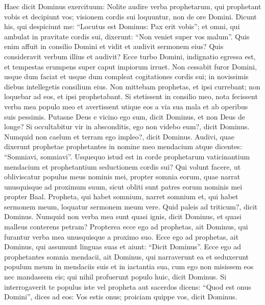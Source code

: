 \begin{biblechapter}
\begin{biblechapter}
\begin{biblechapter}
\begin{biblechapter}
\begin{biblechapter}
\begin{biblechapter}
\begin{biblechapter}
\begin{biblechapter}
\begin{biblechapter}
\begin{biblechapter}
\begin{biblechapter}
\begin{biblechapter}
\begin{biblechapter}
\begin{biblechapter}
\begin{biblechapter}
\begin{biblechapter}
\begin{biblechapter}
\begin{biblechapter}
\begin{biblechapter}
\begin{biblechapter}
\begin{biblechapter}
\begin{biblechapter}
\begin{biblechapter}
 \verse Haec dicit Dominus exercituum: Nolite audire verba prophetarum, qui prophetant vobis et decipiunt vos; visionem cordis sui loquuntur, non de ore Domini.
 \verse Dicunt his, qui despiciunt me:
 “Locutus est Dominus: Pax erit vobis”;
 et omni, qui ambulat in pravitate cordis sui,
 dixerunt: “Non veniet super vos malum”.
 \verse Quis enim affuit in consilio Domini et vidit et audivit sermonem eius? Quis consideravit verbum illius et audivit?
 \verse Ecce turbo Domini, indignatio egressa est,
 et tempestas erumpens super caput impiorum irruet.
 \verse Non cessabit furor Domini, usque dum faciat
 et usque dum compleat cogitationes cordis sui;
 in novissimis diebus intellegetis consilium eius.
 \verse Non mittebam prophetas,
 et ipsi currebant;
 non loquebar ad eos,
 et ipsi prophetabant.
 \verse Si stetissent in consilio meo,
 nota fecissent verba mea populo meo
 et avertissent utique eos a via sua mala
 et ab operibus suis pessimis.
 \verse Putasne Deus e vicino ego sum,
 dicit Dominus,
 et non Deus de longe?
 \verse Si occultabitur vir in absconditis,
 ego non videbo eum?,
 dicit Dominus.
 Numquid non caelum et terram ego impleo?,
 dicit Dominus.
 \verse Audivi, quae dixerunt prophetae prophetantes in nomine meo mendacium atque dicentes: “Somniavi, somniavi”. 
\verse Usquequo istud est in corde prophetarum vaticinantium mendacium et prophetantium seductionem cordis sui? 
\verse Qui volunt facere, ut obliviscatur populus meus nominis mei, propter somnia eorum, quae narrat unusquisque ad proximum suum, sicut obliti sunt patres eorum nominis mei propter Baal. 
\verse Propheta, qui habet somnium, narret somnium et, qui habet sermonem meum, loquatur sermonem meum vere.
 Quid paleis ad triticum?,
 dicit Dominus.
 \verse Numquid non verba mea sunt quasi ignis,
 dicit Dominus,
 et quasi malleus conterens petram? 
\verse Propterea ecce ego ad prophetas, ait Dominus, qui furantur verba mea unusquisque a proximo suo. 
\verse Ecce ego ad prophetas, ait Dominus, qui assumunt linguas suas et aiunt: “Dicit Dominus”. 
\verse Ecce ego ad prophetantes somnia mendacii, ait Dominus, qui narraverunt ea et seduxerunt populum meum in mendaciis suis et in iactantia sua, cum ego non misissem eos nec mandassem eis; qui nihil profuerunt populo huic, dicit Dominus.
 \verse Si interrogaverit te populus iste vel propheta aut sacerdos dicens: “Quod est onus Domini”, dices ad eos: Vos estis onus; proiciam quippe vos, dicit Dominus. 

\end{biblechapter}
\end{biblechapter}
\end{biblechapter}
\end{biblechapter}
\end{biblechapter}
\end{biblechapter}
\end{biblechapter}
\end{biblechapter}
\end{biblechapter}
\end{biblechapter}
\end{biblechapter}
\end{biblechapter}
\end{biblechapter}
\end{biblechapter}
\end{biblechapter}
\end{biblechapter}
\end{biblechapter}
\end{biblechapter}
\end{biblechapter}
\end{biblechapter}
\end{biblechapter}
\end{biblechapter}
\end{biblechapter}
